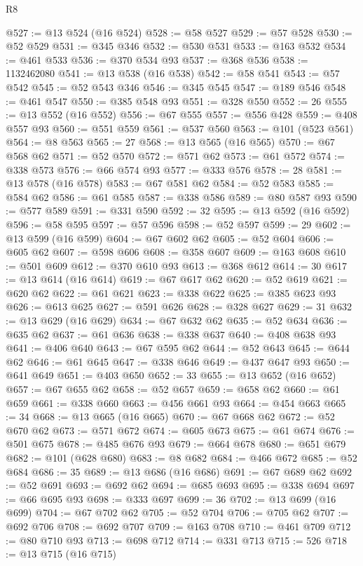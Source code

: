 \begin{lexlean}{R8}
\begin{coremodule}
@527 := @13 @524 (@16 @524)
@528 := @58 @527
@529 := @57 @528
@530 := @52 @529
@531 := @345 @346
@532 := @530 @531
@533 := @163 @532
@534 := @461 @533
@536 := @370 @534 @93
@537 := @368 @536
@538 := 1132462080
@541 := @13 @538 (@16 @538)
@542 := @58 @541
@543 := @57 @542
@545 := @52 @543 @346
@546 := @345 @545
@547 := @189 @546
@548 := @461 @547
@550 := @385 @548 @93
@551 := @328 @550
@552 := 26
@555 := @13 @552 (@16 @552)
@556 := @67 @555
@557 := @556 @428
@559 := @408 @557 @93
@560 := @551 @559
@561 := @537 @560
@563 := @101 (@523 @561)
@564 := @8 @563
@565 := 27
@568 := @13 @565 (@16 @565)
@570 := @67 @568 @62
@571 := @52 @570
@572 := @571 @62
@573 := @61 @572
@574 := @338 @573
@576 := @66 @574 @93
@577 := @333 @576
@578 := 28
@581 := @13 @578 (@16 @578)
@583 := @67 @581 @62
@584 := @52 @583
@585 := @584 @62
@586 := @61 @585
@587 := @338 @586
@589 := @80 @587 @93
@590 := @577 @589
@591 := @331 @590
@592 := 32
@595 := @13 @592 (@16 @592)
@596 := @58 @595
@597 := @57 @596
@598 := @52 @597
@599 := 29
@602 := @13 @599 (@16 @599)
@604 := @67 @602 @62
@605 := @52 @604
@606 := @605 @62
@607 := @598 @606
@608 := @358 @607
@609 := @163 @608
@610 := @501 @609
@612 := @370 @610 @93
@613 := @368 @612
@614 := 30
@617 := @13 @614 (@16 @614)
@619 := @67 @617 @62
@620 := @52 @619
@621 := @620 @62
@622 := @61 @621
@623 := @338 @622
@625 := @385 @623 @93
@626 := @613 @625
@627 := @591 @626
@628 := @328 @627
@629 := 31
@632 := @13 @629 (@16 @629)
@634 := @67 @632 @62
@635 := @52 @634
@636 := @635 @62
@637 := @61 @636
@638 := @338 @637
@640 := @408 @638 @93
@641 := @406 @640
@643 := @67 @595 @62
@644 := @52 @643
@645 := @644 @62
@646 := @61 @645
@647 := @338 @646
@649 := @437 @647 @93
@650 := @641 @649
@651 := @403 @650
@652 := 33
@655 := @13 @652 (@16 @652)
@657 := @67 @655 @62
@658 := @52 @657
@659 := @658 @62
@660 := @61 @659
@661 := @338 @660
@663 := @456 @661 @93
@664 := @454 @663
@665 := 34
@668 := @13 @665 (@16 @665)
@670 := @67 @668 @62
@672 := @52 @670 @62
@673 := @571 @672
@674 := @605 @673
@675 := @61 @674
@676 := @501 @675
@678 := @485 @676 @93
@679 := @664 @678
@680 := @651 @679
@682 := @101 (@628 @680)
@683 := @8 @682
@684 := @466 @672
@685 := @52 @684
@686 := 35
@689 := @13 @686 (@16 @686)
@691 := @67 @689 @62
@692 := @52 @691
@693 := @692 @62
@694 := @685 @693
@695 := @338 @694
@697 := @66 @695 @93
@698 := @333 @697
@699 := 36
@702 := @13 @699 (@16 @699)
@704 := @67 @702 @62
@705 := @52 @704
@706 := @705 @62
@707 := @692 @706
@708 := @692 @707
@709 := @163 @708
@710 := @461 @709
@712 := @80 @710 @93
@713 := @698 @712
@714 := @331 @713
@715 := 526
@718 := @13 @715 (@16 @715)

\end{coremodule}
\end{lexlean}
